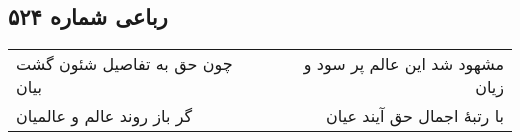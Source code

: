 \begin{center}
\section*{رباعی شماره ۵۲۴}
\label{sec:sh524}
\begin{longtable}{l p{0.5cm} r}
چون حق به تفاصیل شئون گشت بیان
&&
مشهود شد این عالم پر سود و زیان
\\
گر باز روند عالم و عالمیان
&&
با رتبهٔ اجمال حق آیند عیان
\\
\end{longtable}
\end{center}

